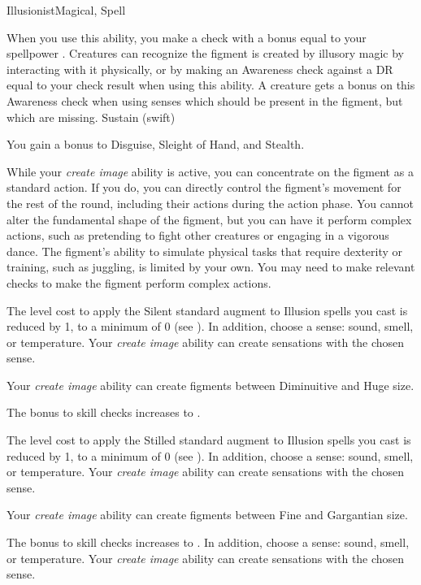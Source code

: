 \begin{feat}{Illusionist}{Magical, Spell}
\begin{ability}
\begin{spelleffects}
                When you use this ability, you make a check with a bonus equal to your spellpower .
                Creatures can recognize the figment is created by illusory magic by interacting with it physically, or by making an Awareness check against a DR equal to your check result when using this ability.
                A creature gets a  bonus on this Awareness check when using senses which should be present in the figment, but which are missing.
                \spelldur Sustain (swift)
            \end{spelleffects}
        \end{ability}

         You gain a  bonus to Disguise, Sleight of Hand, and Stealth.

         While your \textit{create image} ability is active, you can concentrate on the figment as a standard action.
        If you do, you can directly control the figment's movement for the rest of the round, including their actions during the action phase.
        You cannot alter the fundamental shape of the figment, but you can have it perform complex actions, such as pretending to fight other creatures or engaging in a vigorous dance.
        The figment's ability to simulate physical tasks that require dexterity or training, such as juggling, is limited by your own.
        You may need to make relevant checks to make the figment perform complex actions.

         The level cost to apply the Silent standard augment to Illusion spells you cast is reduced by 1, to a minimum of 0 (see ).
        In addition, choose a sense: sound, smell, or temperature.
        Your \textit{create image} ability can create sensations with the chosen sense.

         Your \textit{create image} ability can create figments between Diminuitive and Huge size.

         The bonus to skill checks increases to .

         The level cost to apply the Stilled standard augment to Illusion spells you cast is reduced by 1, to a minimum of 0 (see ).
        In addition, choose a sense: sound, smell, or temperature.
        Your \textit{create image} ability can create sensations with the chosen sense.

         Your \textit{create image} ability can create figments between Fine and Gargantian size.

         The bonus to skill checks increases to .
        In addition, choose a sense: sound, smell, or temperature.
        Your \textit{create image} ability can create sensations with the chosen sense.
    \end{feat}

